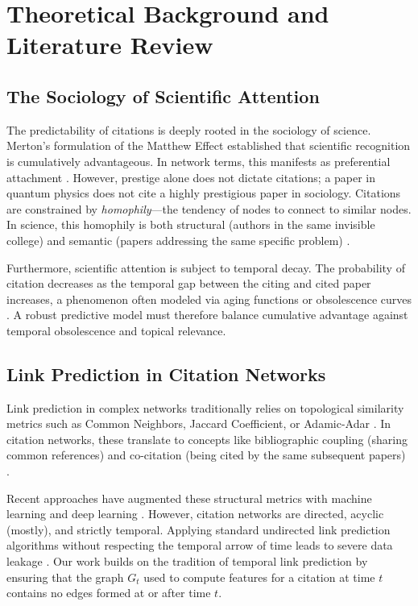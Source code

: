 \documentclass[11pt,a4paper]{article}
\begin{document}
\section{Theoretical Background and Literature Review}

\subsection{The Sociology of Scientific Attention}
The predictability of citations is deeply rooted in the sociology of science. Merton's formulation of the Matthew Effect \cite{merton1968matthew} established that scientific recognition is cumulatively advantageous. In network terms, this manifests as preferential attachment \cite{barabasi1999emergence, de2000preferential}. However, prestige alone does not dictate citations; a paper in quantum physics does not cite a highly prestigious paper in sociology. Citations are constrained by \textit{homophily}—the tendency of nodes to connect to similar nodes. In science, this homophily is both structural (authors in the same invisible college) and semantic (papers addressing the same specific problem) \cite{crane1972invisible}.

Furthermore, scientific attention is subject to temporal decay. The probability of citation decreases as the temporal gap between the citing and cited paper increases, a phenomenon often modeled via aging functions or obsolescence curves \cite{redner2005citation, wang2013quantifying}. A robust predictive model must therefore balance cumulative advantage against temporal obsolescence and topical relevance.

\subsection{Link Prediction in Citation Networks}
Link prediction in complex networks traditionally relies on topological similarity metrics such as Common Neighbors, Jaccard Coefficient, or Adamic-Adar \cite{liben2007link}. In citation networks, these translate to concepts like bibliographic coupling (sharing common references) and co-citation (being cited by the same subsequent papers) \cite{kessler1963bibliographic, small1973co}. 

Recent approaches have augmented these structural metrics with machine learning and deep learning \cite{bhagavatula2018content}. However, citation networks are directed, acyclic (mostly), and strictly temporal. Applying standard undirected link prediction algorithms without respecting the temporal arrow of time leads to severe data leakage \cite{shibata2012link}. Our work builds on the tradition of temporal link prediction by ensuring that the graph $G_t$ used to compute features for a citation at time $t$ contains no edges formed at or after time $t$.
\end{document}
